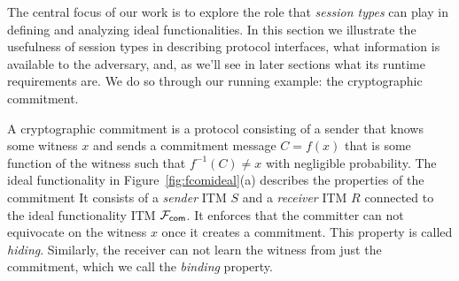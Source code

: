 
The central focus of our work is to explore the role that \emph{session types} can play in defining and analyzing ideal functionalities.
In this section we illustrate the usefulness of session types in describing protocol interfaces, what information  is available to the adversary, and, as we'll see in later sections
what its runtime requirements are. 
We do so through our running example: the cryptographic commitment. 

A cryptographic commitment is a protocol consisting of a sender that knows some witness $x$ and sends a commitment message $C = f(x)$ that is
some function of the witness such that $f^{-1}(C) \neq x$ with negligible probability. 
The ideal functionality \Fcom in Figure~\ref{fig:fcomideal}(a) describes the properties of the commitment
It consists of a  \emph{sender} ITM $S$ and a \emph{receiver} ITM $R$ connected to 
the ideal functionality ITM $\mathcal{F}_{{\mathsf {com}}}$. It enforces that the committer can not equivocate on the witness $x$ once it creates a commitment.
This property is called \emph{hiding}.
Similarly, the receiver can not learn the witness from just the commitment, which we call the \emph{binding} property.


